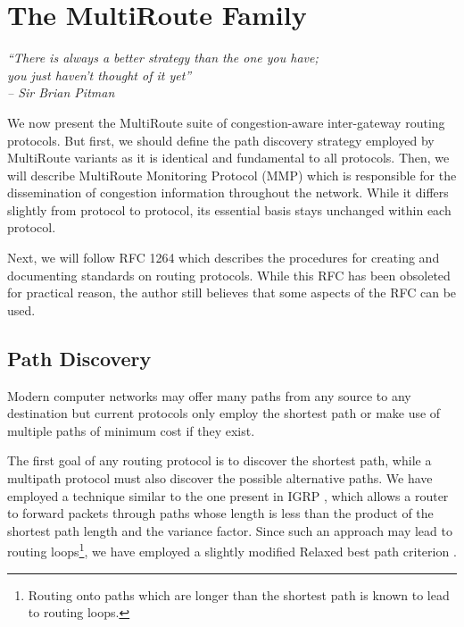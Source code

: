 \chapter{The MultiRoute Family}
\label{chap:cornerstones}
\label{sect:multiroutes}
\begin{flushright}
 \textit{\textquotedblleft There is always a better strategy than the one you
have; \\ 
you just haven't thought of it yet\textquotedblright}\\
\textit{-- Sir Brian Pitman}
\end{flushright}


\ifpdf
    \graphicspath{{5-CornerMultipath/Chapter5Figs}{5-CornerMultipath/Chapter5Figs/PDF/}{5-CornerMultipath/Chapter5Figs/}}
\else
    \graphicspath{{5-CornerMultipath/Chapter5Figs/EPS/}{5-CornerMultipath/Chapter5Figs/}}
\fi

We now present the MultiRoute suite of congestion-aware inter-gateway routing protocols. But
first, we should define the path discovery strategy employed by MultiRoute
variants as it is identical and fundamental to all protocols. Then, we will
describe MultiRoute Monitoring Protocol (MMP) which is responsible for the
dissemination of congestion information throughout the network. While it differs
slightly from protocol to protocol, its essential basis stays unchanged within
each protocol. 

Next, we will follow RFC 1264 \cite{RFC1264} which describes the procedures for
creating and documenting standards on routing protocols. While this RFC has
been obsoleted for practical reason, the author still believes that some
aspects of the RFC can be used.


\section{Path Discovery}


Modern computer networks may offer many paths from any source to any
destination but current protocols only employ the shortest path or make use of
multiple paths of minimum cost if they exist. 

The first goal of any routing protocol is to discover the shortest path, while
a multipath protocol must also discover the possible alternative paths. We have
employed a technique similar to the one present in IGRP \cite{pat:IGRP}, which
allows a router to forward packets through paths whose length is less than the
product of the shortest path length and the variance factor. Since such an
approach may lead to routing loops\footnote{Routing onto paths which are
longer than the shortest path is known to lead to routing loops.}, we have
employed a slightly modified Relaxed
best path criterion \cite{OMP}.

